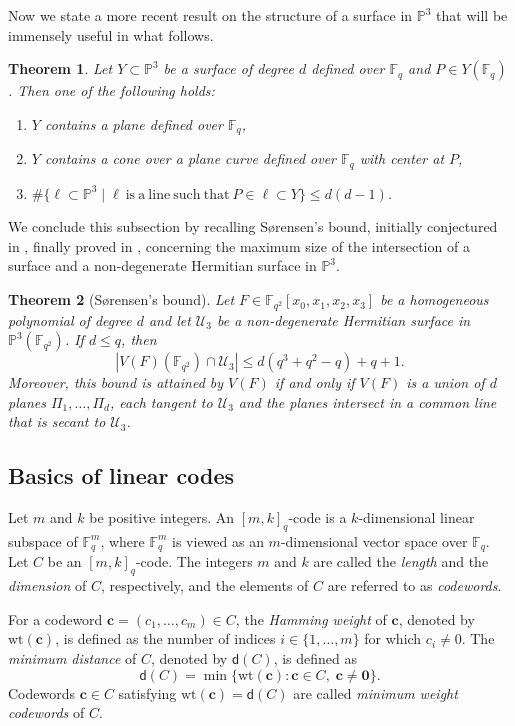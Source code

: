 \documentclass[10pt,a4paper,oneside]{amsproc}
\newtheorem{theorem}{Theorem}[section]
\newcommand{\wt}{\mathrm{wt}}
\newcommand{\Fqt}{\mathbb{F}_{q^2}}
\newcommand{\Fq}{\mathbb{F}_q}
\newcommand{\U}{\mathcal{U}}
\def\Fq{{\mathbb F}_q}
\def\FF{{\mathbb F}}
\def\PP{{\mathbb P}}
\begin{document}
Now we state a more recent result on the structure of a surface in $\PP^3$ that will be immensely useful in what follows.

\begin{theorem}\label{Datta}\cite[Theorem 3.1]{D}
    Let $Y \subset \PP^3$ be a surface of degree $d$ defined over $\Fq$ and $P \in Y(\Fq)$. Then one of the following holds: 
    \begin{enumerate}
        \item[(a)] $Y$ contains a plane defined over $\Fq$, 
        \item[(b)] $Y$ contains a cone over a plane curve defined over $\Fq$ with center at $P$, 
        \item[(c)] $\# \{\ell \subset \PP^3 \mid \ell \ \mathrm{is \ a \ line \ such \ that} \ P \in \ell \subset Y\} \le d(d - 1)$.
        \end{enumerate}
    \end{theorem}

   We conclude this subsection by recalling S{\o}rensen's bound, initially conjectured in \cite{SoT}, finally proved in \cite{BDH}, concerning the maximum size of the intersection of a surface and a non-degenerate Hermitian surface in $\PP^3$. 
 
 \begin{theorem} [S{\o}rensen's bound] \cite[Corollary 5.2]{BDH}\label{SoB}
Let $F \in \Fqt[x_0, x_1, x_2, x_3]$ be a homogeneous polynomial of degree $d$ and let $\U_3$ be a non-degenerate Hermitian surface in $\PP^3 (\Fqt)$. If $d \le q$, then
$$|V(F)(\Fqt) \cap \U_3| \le d(q^3 + q^2 - q) + q + 1.$$
Moreover, this bound is attained by $V(F)$ if and only if $V(F)$ is a union of $d$ planes $\Pi_1, \dots, \Pi_d$, each tangent to $\U_3$ and the planes intersect in a common line that is secant to $\U_3$. 
\end{theorem}


\subsection{Basics of linear codes}\label{linear code} Let $m$ and $k$ be positive integers. An $[m,k]_q$-code is a $k$-dimensional linear subspace of $\FF_q^m$, where $\FF_q^m$ is viewed as an $ m$-dimensional vector space over $\Fq$. Let $C$ be an $[m,k]_q$-code. The integers $m$ and $k$ are called the \textit{length} and the \textit{dimension} of $C$, respectively, and the elements of $C$ are referred to as \textit{codewords}. 

For a codeword $\mathbf{c}=(c_1,\dots,c_m)\in C$, the \textit{Hamming weight} of $\mathbf{c}$, denoted by $\wt(\mathbf{c})$, is defined as the number of indices $i\in\{1,\dots,m\}$ for which $c_i\neq 0$. The \textit{minimum distance} of $C$, denoted by $\mathsf{d}(C)$, is defined as
\[
\mathsf{d}(C)=\min\{\wt(\mathbf{c}): \mathbf{c}\in C,\; \mathbf{c}\neq \mathbf{0}\}.
\]
Codewords $\mathbf{c}\in C$ satisfying $\wt(\mathbf{c})=\mathsf{d}(C)$ are called \textit{minimum weight codewords} of $C$.
\end{document}
